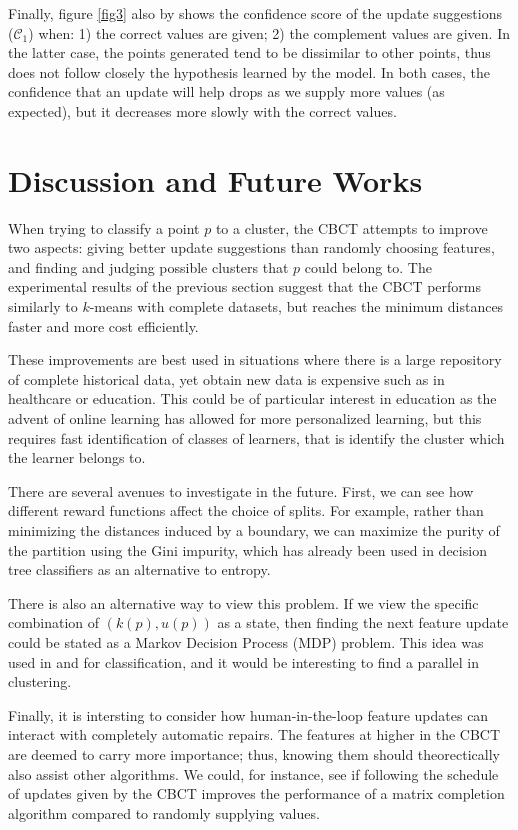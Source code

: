 \documentclass[conference]{IEEEtran}
\begin{document}
Finally, figure
\ref{fig3} also by shows the confidence score of the update suggestions 
($\mathcal{C}_1$) when: 1) the correct values are given; 2) the complement
values are given. In the latter case, the points generated tend to be dissimilar
to other points, thus does not follow closely the hypothesis learned by the model.
In both cases, the confidence that an update will help drops as we supply
more values (as expected), but it decreases more slowly with the correct values.


\section{Discussion and Future Works}
When trying to classify a point $p$ to a cluster, the CBCT attempts to
improve two aspects: giving better update suggestions than randomly
choosing features, and finding and judging possible clusters that $p$ could
belong to. The experimental results of the previous section suggest that
the CBCT performs similarly to $k$-means with complete datasets, but
reaches the minimum distances faster and more cost efficiently. 

These improvements are best used in situations where there is a large
repository of complete historical data, yet obtain new data is expensive
such as in healthcare or education. This could be of particular interest in
education as the advent of online learning has allowed for more personalized
learning, but this requires fast identification of classes of learners, that is
identify the cluster which the learner belongs to. 

There are several avenues to investigate in the future. First, we can see how
different reward functions affect the choice of splits. For example,
rather than minimizing the distances induced by a boundary, we can
maximize the purity of the partition using the Gini impurity, which has already
been used in decision tree classifiers as an alternative to entropy.

There is also an alternative way to view this problem. If we view
the specific combination of $(k(p),u(p))$ as a state, then finding the next
feature update could be stated as a Markov Decision Process (MDP) problem.
This idea was used in \cite{b9} and \cite{b8} for classification, and it would
be interesting to find a parallel in clustering.


Finally, it is intersting to consider how human-in-the-loop feature updates
can interact with completely automatic repairs. The features at higher in
the CBCT are deemed to carry more importance; thus, knowing them should
theorectically also assist other algorithms. We could, for instance, see if
following the schedule of updates given by the CBCT improves the 
performance of a matrix completion algorithm compared to randomly supplying
values.
\end{document}
